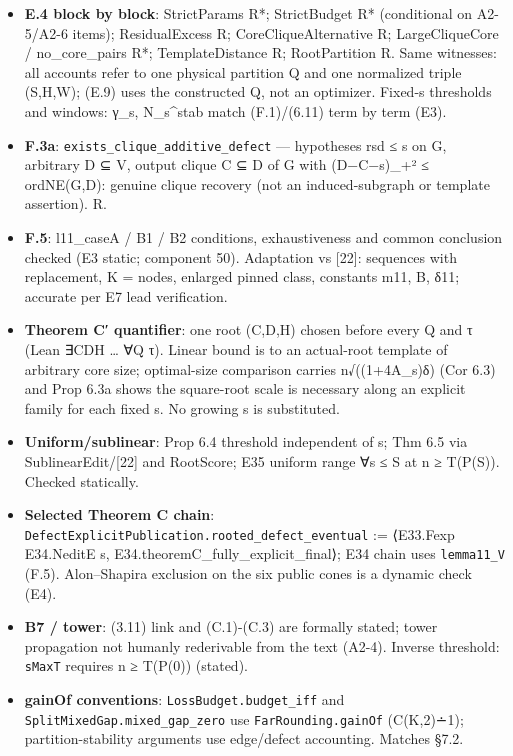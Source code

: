 \documentclass[
]{article}
\providecommand{\tightlist}{%
  \setlength{\itemsep}{0pt}\setlength{\parskip}{0pt}}
\begin{document}
\begin{itemize}
\tightlist
\item
  \textbf{E.4 block by block}: StrictParams R*; StrictBudget R*
  (conditional on A2-5/A2-6 items); ResidualExcess R;
  CoreCliqueAlternative R; LargeCliqueCore / no\_core\_pairs R*;
  TemplateDistance R; RootPartition R. Same witnesses: all accounts
  refer to one physical partition Q and one normalized triple (S,H,W);
  (E.9) uses the constructed Q, not an optimizer. Fixed-s thresholds and
  windows: γ\_s, N\_s\^{}stab match (F.1)/(6.11) term by term (E3).
\item
  \textbf{F.3a}: \texttt{exists\_clique\_additive\_defect} ---
  hypotheses rsd ≤ s on G, arbitrary D ⊆ V, output clique C ⊆ D of G
  with (\textbar D\textbar−\textbar C\textbar−s)\_+² ≤ ordNE(G,D):
  genuine clique recovery (not an induced-subgraph or template
  assertion). R.
\item
  \textbf{F.5}: l11\_caseA / B1 / B2 conditions, exhaustiveness and
  common conclusion checked (E3 static; component 50). Adaptation vs
  {[}22{]}: sequences with replacement, K = nodes, enlarged pinned
  class, constants m11, B, δ11; accurate per E7 lead verification.
\item
  \textbf{Theorem C′ quantifier}: one root (C,D,H) chosen before every Q
  and τ (Lean ∃CDH \ldots{} ∀Q τ). Linear bound is to an actual-root
  template of arbitrary core size; optimal-size comparison carries
  n√((1+4A\_s)δ) (Cor 6.3) and Prop 6.3a shows the square-root scale is
  necessary along an explicit family for each fixed s. No growing s is
  substituted.
\item
  \textbf{Uniform/sublinear}: Prop 6.4 threshold independent of s; Thm
  6.5 via SublinearEdit/{[}22{]} and RootScore; E35 uniform range ∀s ≤ S
  at n ≥ T(P(S)). Checked statically.
\item
  \textbf{Selected Theorem C chain}:
  \texttt{DefectExplicitPublication.rooted\_defect\_eventual} :=
  ⟨E33.Fexp E34.NeditE s, E34.theoremC\_fully\_explicit\_final⟩; E34
  chain uses \texttt{lemma11\_V} (F.5). Alon--Shapira exclusion on the
  six public cones is a dynamic check (E4).
\item
  \textbf{B7 / tower}: (3.11) link and (C.1)-(C.3) are formally stated;
  tower propagation not humanly rederivable from the text (A2-4).
  Inverse threshold: \texttt{sMaxT} requires n ≥ T(P(0)) (stated).
\item
  \textbf{gainOf conventions}: \texttt{LossBudget.budget\_iff} and
  \texttt{SplitMixedGap.mixed\_gap\_zero} use
  \texttt{FarRounding.gainOf} (C(\textbar K\textbar,2)∸1);
  partition-stability arguments use edge/defect accounting. Matches
  §7.2.
\end{itemize}
\end{document}
